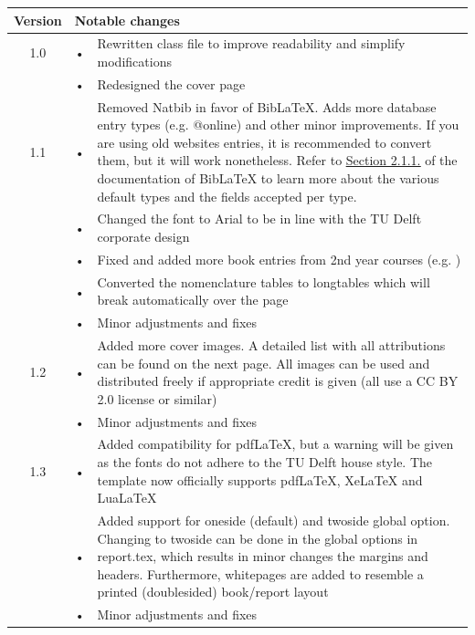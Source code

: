 \begin{table}[h]
    \centering
    \begin{tabularx}{0.9\linewidth}{crX}
        \toprule
        Version & \multicolumn{2}{l}{Notable changes} \\
        \midrule
        1.0 & • & Rewritten class file to improve readability and simplify modifications \\
        & • & Redesigned the cover page \\
        \midrule
        1.1 & • & Removed Natbib in favor of BibLaTeX. Adds more database entry types (e.g. @online) and other minor improvements. If you are using old websites entries, it is recommended to convert them, but it will work nonetheless. Refer to \underline{\href{http://mirrors.ctan.org/macros/latex/contrib/biblatex/doc/biblatex.pdf\#subsubsection.2.1.1}{Section 2.1.1.}} of the documentation of BibLaTeX to learn more about the various default types and the fields accepted per type.\\
        & • & Changed the font to Arial to be in line with the TU Delft corporate design \\
        & • & Fixed and added more book entries from 2nd year courses (e.g. \cite{anderson-fundamentals-of-aerodynamics,megson-aircraft-structures}) \\
        & • & Converted the nomenclature tables to longtables which will break automatically over the page \\
        & • & Minor adjustments and fixes \\
        \midrule
        1.2 & • & Added more cover images. A detailed list with all attributions can be found on the next page. All images can be used and distributed freely if appropriate credit is given (all use a CC BY 2.0 license or similar) \\
        & • & Minor adjustments and fixes \\
        \midrule
        1.3 & • & Added compatibility for pdfLaTeX, but a warning will be given as the fonts do not adhere to the TU Delft house style. The template now officially supports pdfLaTeX, XeLaTeX and LuaLaTeX \\
        & • & Added support for oneside (default) and twoside global option. Changing to twoside can be done in the global options in report.tex, which results in minor changes the margins and headers. Furthermore, whitepages are added to resemble a printed (doublesided) book/report layout \\
        & • & Minor adjustments and fixes \\
        \bottomrule
    \end{tabularx}
\end{table}

